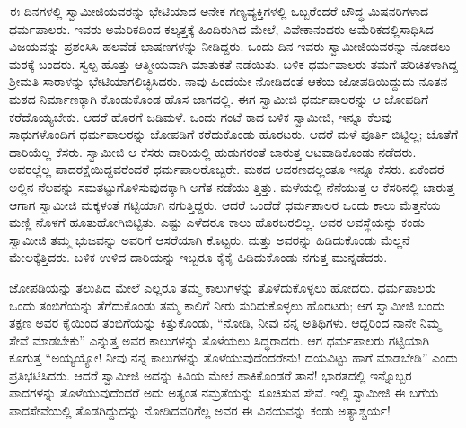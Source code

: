 ಈ ದಿನಗಳಲ್ಲಿ ಸ್ವಾಮೀಜಿಯವರನ್ನು ಭೇಟಿಯಾದ ಅನೇಕ ಗಣ್ಯವ್ಯಕ್ತಿಗಳಲ್ಲಿ ಒಬ್ಬರೆಂದರೆ ಬೌದ್ಧ ಮಿಷನರಿಗಳಾದ ಧರ್ಮಪಾಲರು. ಇವರು ಅಮೆರಿಕದಿಂದ ಕಲ್ಕತ್ತಕ್ಕೆ ಹಿಂದಿರುಗಿದ ಮೇಲೆ, ವಿವೇಕಾನಂದರು ಅಮೆರಿಕದಲ್ಲಿಸಾಧಿಸಿದ ವಿಜಯವನ್ನು ಪ್ರಶಂಸಿಸಿ ಹಲವೆಡೆ ಭಾಷಣಗಳನ್ನು ನೀಡಿದ್ದರು. ಒಂದು ದಿನ ಇವರು ಸ್ವಾಮೀಜಿಯವರನ್ನು ನೋಡಲು ಮಠಕ್ಕೆ ಬಂದರು. ಸ್ವಲ್ಪ ಹೊತ್ತು ಆತ್ಮೀಯವಾಗಿ ಮಾತುಕತೆ ನಡೆಯಿತು. ಬಳಿಕ ಧರ್ಮಪಾಲರು ತಮಗೆ ಪರಿಚಿತಳಾಗಿದ್ದ ಶ್ರೀಮತಿ ಸಾರಾಳನ್ನು ಭೇಟಿಯಾಗಲಿಚ್ಛಿಸಿದರು. ನಾವು ಹಿಂದೆಯೇ ನೋಡಿದಂತೆ ಆಕೆಯ ಜೋಪಡಿಯಿದ್ದುದು ನೂತನ ಮಠದ ನಿರ್ಮಾಣಕ್ಕಾಗಿ ಕೊಂಡುಕೊಂಡ ಹೊಸ ಜಾಗದಲ್ಲಿ. ಈಗ ಸ್ವಾಮೀಜಿ ಧರ್ಮಪಾಲರನ್ನು ಆ ಜೋಪಡಿಗೆ ಕರೆದೊಯ್ಯಬೇಕು. ಆದರೆ ಹೊರಗೆ ಜಡಿಮಳೆ. ಒಂದು ಗಂಟೆ ಕಾದ ಬಳಿಕ ಸ್ವಾಮೀಜಿ, ಇನ್ನೂ ಕೆಲವು ಸಾಧುಗಳೊಂದಿಗೆ ಧರ್ಮಪಾಲರನ್ನು ಜೋಪಡಿಗೆ ಕರೆದುಕೊಂಡು ಹೊರಟರು. ಆದರೆ ಮಳೆ ಪೂರ್ತಿ ಬಿಟ್ಟಿಲ್ಲ; ಜೊತೆಗೆ ದಾರಿಯೆಲ್ಲ ಕೆಸರು. ಸ್ವಾಮೀಜಿ ಆ ಕೆಸರು ದಾರಿಯಲ್ಲಿ ಹುಡುಗರಂತೆ ಜಾರುತ್ತ ಆಟವಾಡಿಕೊಂಡು ನಡೆದರು. ಅವರಲ್ಲೆಲ್ಲ ಪಾದರಕ್ಷೆಯಿದ್ದವರೆಂದರೆ ಧರ್ಮಪಾಲರೊಬ್ಬರೇ. ಮಠದ ಆವರಣದಲ್ಲಂತೂ ಇನ್ನೂ ಕೆಸರು. ಏಕೆಂದರೆ ಅಲ್ಲಿನ ನೆಲವನ್ನು ಸಮತಟ್ಟುಗೊಳಿಸುವುದಕ್ಕಾಗಿ ಅಗೆತ ನಡೆಯು ತ್ತಿತ್ತು. ಮಳೆಯಲ್ಲಿ ನೆನೆಯುತ್ತ ಆ ಕೆಸರಿನಲ್ಲಿ ಜಾರುತ್ತ ಆಗಾಗ ಸ್ವಾಮೀಜಿ ಮಕ್ಕಳಂತೆ ಗಟ್ಟಿಯಾಗಿ ನಗುತ್ತಿದ್ದರು. ಆದರೆ ಒಂದೆಡೆ ಧರ್ಮಪಾಲರ ಒಂದು ಕಾಲು ಮೆತ್ತನೆಯ ಮಣ್ಣಿ ನೊಳಗೆ ಹೂತುಹೋಗಿಬಿಟ್ಟಿತು. ಎಷ್ಟು ಎಳೆದರೂ ಕಾಲು ಹೊರಬರಲಿಲ್ಲ. ಅವರ ಅವಸ್ಥೆಯನ್ನು ಕಂಡು ಸ್ವಾಮೀಜಿ ತಮ್ಮ ಭುಜವನ್ನು ಅವರಿಗೆ ಆಸರೆಯಾಗಿ ಕೊಟ್ಟರು. ಮತ್ತು ಅವರನ್ನು ಹಿಡಿದುಕೊಂಡು ಮೆಲ್ಲನೆ ಮೇಲಕ್ಕೆತ್ತಿದರು. ಬಳಿಕ ಉಳಿದ ದಾರಿಯನ್ನು ಇಬ್ಬರೂ ಕೈಕೈ ಹಿಡಿದುಕೊಂಡು ನಗುತ್ತ ಮುನ್ನಡೆದರು.

ಜೋಪಡಿಯನ್ನು ತಲುಪಿದ ಮೇಲೆ ಎಲ್ಲರೂ ತಮ್ಮ ಕಾಲುಗಳನ್ನು ತೊಳೆದುಕೊಳ್ಳಲು ಹೋದರು. ಧರ್ಮಪಾಲರು ಒಂದು ತಂಬಿಗೆಯನ್ನು ತೆಗೆದುಕೊಂಡು ತಮ್ಮ ಕಾಲಿಗೆ ನೀರು ಸುರಿದುಕೊಳ್ಳಲು ಹೊರಟರು; ಆಗ ಸ್ವಾಮೀಜಿ ಬಂದು ತಕ್ಷಣ ಅವರ ಕೈಯಿಂದ ತಂಬಿಗೆಯನ್ನು ಕಿತ್ತುಕೊಂಡು, “ನೋಡಿ, ನೀವು ನನ್ನ ಅತಿಥಿಗಳು. ಆದ್ದರಿಂದ ನಾನೇ ನಿಮ್ಮ ಸೇವೆ ಮಾಡಬೇಕು” ಎನ್ನುತ್ತ ಅವರ ಕಾಲುಗಳನ್ನು ತೊಳೆಯಲು ಸಿದ್ಧರಾದರು. ಆಗ ಧರ್ಮಪಾಲರು ಗಟ್ಟಿಯಾಗಿ ಕೂಗುತ್ತ “ಅಯ್ಯಯ್ಯೋ! ನೀವು ನನ್ನ ಕಾಲುಗಳನ್ನು ತೊಳೆಯುವುದೆಂದರೇನು! ದಯವಿಟ್ಟು ಹಾಗೆ ಮಾಡಬೇಡಿ” ಎಂದು ಪ್ರತಿಭಟಿಸಿದರು. ಆದರೆ ಸ್ವಾಮೀಜಿ ಅದನ್ನು ಕಿವಿಯ ಮೇಲೆ ಹಾಕಿಕೊಂಡರೆ ತಾನೆ! ಭಾರತದಲ್ಲಿ ಇನ್ನೊಬ್ಬರ ಪಾದಗಳನ್ನು ತೊಳೆಯುವುದೆಂದರೆ ಅದು ಅತ್ಯಂತ ನಮ್ರತೆಯನ್ನು ಸೂಚಿಸುವ ಸೇವೆ. ಇಲ್ಲಿ ಸ್ವಾಮೀಜಿ ಈ ಬಗೆಯ ಪಾದಸೇವೆಯಲ್ಲಿ ತೊಡಗಿದ್ದುದನ್ನು ನೋಡಿದವರಿಗೆಲ್ಲ ಅವರ ಈ ವಿನಯವನ್ನು ಕಂಡು ಅತ್ಯಾಶ್ಚರ್ಯ!

